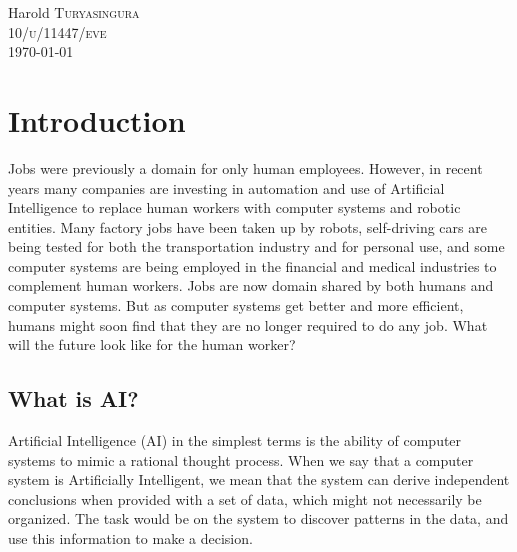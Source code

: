 \documentclass[12pt, a4paper]{report}
\begin{document}
\begin{titlepage}

\large
Harold \textsc{Turyasingura}\\
\textsc{10/u/11447/eve}\\[3cm] %

{\large \today}

\vfill

\end{titlepage}

\tableofcontents
\newpage

\sectionfont{\scshape}
\section*{Introduction}
Jobs were previously a domain for only human employees. However, in recent years many
companies are investing in automation and use of Artificial Intelligence to replace human
workers with computer systems and robotic entities. Many factory jobs have been taken up
by robots, self-driving cars are being tested for both the transportation industry and for
personal use, and some computer systems are being employed in the financial and medical
industries to complement human workers. Jobs are now domain shared by both humans and
computer systems. But as computer systems get better and more efficient, humans might soon
find that they are no longer required to do any job. What will the future look like for
the human worker?\\

\subsection*{What is AI?}
Artificial Intelligence (AI) in the simplest terms is the ability of computer systems to mimic a
rational thought process. When we say that a computer system is Artificially Intelligent,
we mean that the system can derive independent conclusions when provided with a set of
data, which might not necessarily be organized. The task would be on the system to discover
patterns in the data, and use this information to make a decision.\\
\end{document}
